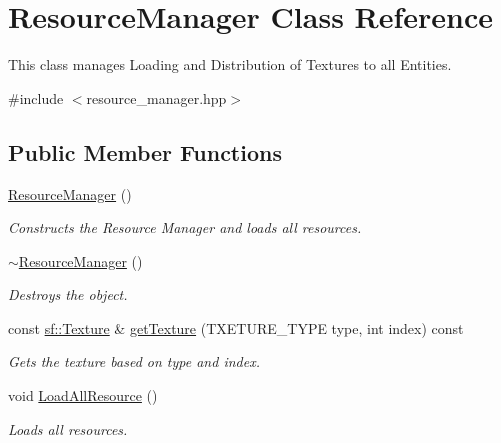 \hypertarget{class_resource_manager}{}\section{Resource\+Manager Class Reference}
\label{class_resource_manager}


This class manages Loading and Distribution of Textures to all Entities.  




{\ttfamily \#include $<$resource\+\_\+manager.\+hpp$>$}

\subsection*{Public Member Functions}
\begin{DoxyCompactItemize}
\item 
\mbox{\label{class_resource_manager_a3b32babd2e81909bbd90d7f2d566fadb}} 
\mbox{\hyperlink{class_resource_manager_a3b32babd2e81909bbd90d7f2d566fadb}{Resource\+Manager}} ()
\begin{DoxyCompactList}\small\item\em Constructs the Resource Manager and loads all resources. \end{DoxyCompactList}\item 
\mbox{\label{class_resource_manager_a671c186e4630599e7e36d000c53eaf80}} 
\mbox{\hyperlink{class_resource_manager_a671c186e4630599e7e36d000c53eaf80}{$\sim$\+Resource\+Manager}} ()
\begin{DoxyCompactList}\small\item\em Destroys the object. \end{DoxyCompactList}\item 
const \mbox{\hyperlink{classsf_1_1_texture}{sf\+::\+Texture}} \& \mbox{\hyperlink{class_resource_manager_a44e2cc2cd3523309224dc115b83f1bcf}{get\+Texture}} (T\+X\+E\+T\+U\+R\+E\+\_\+\+T\+Y\+PE type, int index) const
\begin{DoxyCompactList}\small\item\em Gets the texture based on type and index. \end{DoxyCompactList}\item 
\mbox{\label{class_resource_manager_ab4356c8c21fb00f94b7f4e9f983ad224}} 
void \mbox{\hyperlink{class_resource_manager_ab4356c8c21fb00f94b7f4e9f983ad224}{Load\+All\+Resource}} ()
\begin{DoxyCompactList}\small\item\em Loads all resources. \end{DoxyCompactList}\end{DoxyCompactItemize}
